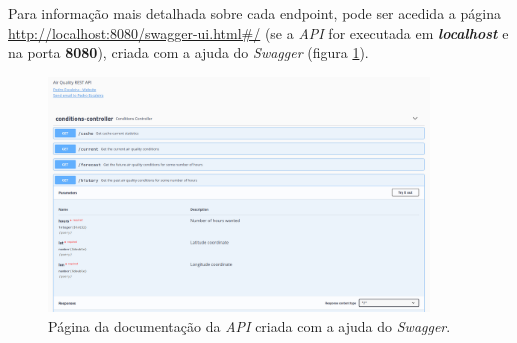 Para informação mais detalhada sobre cada endpoint, pode ser acedida a página \url{http://localhost:8080/swagger-ui.html#/} (se a \textit{API} for executada em \textbf{\textit{localhost}} e na porta \textbf{8080}), criada com a ajuda do \textit{Swagger} (figura \ref{fig:swagger}).

\begin{figure}[h]
   \centering
   \includegraphics[width=0.90\textwidth]{images/swagger}
   \caption{Página da documentação da \textit{API} criada com a ajuda do \textit{Swagger}.}
   \label{fig:swagger}
\end{figure}

